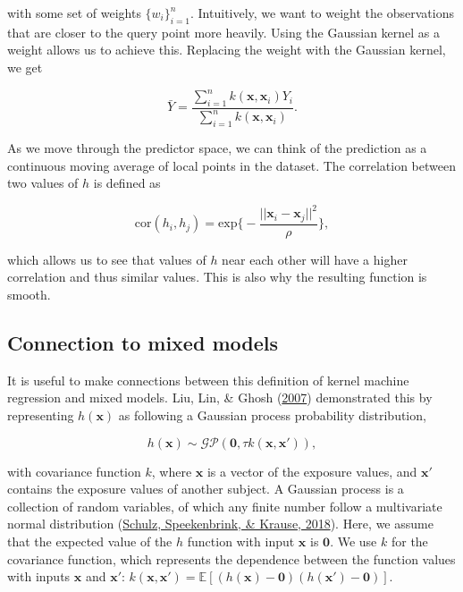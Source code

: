 \documentclass[12pt, twoside]{amherstthesis}
\begin{document}
\noindent with some set of weights \(\{w_i\}_{i=1}^n\). Intuitively, we want to weight the observations that are closer to the query point more heavily. Using the Gaussian kernel as a weight allows us to achieve this. Replacing the weight with the Gaussian kernel, we get

\[
\bar{Y} = \frac{\sum_{i=1}^n k(\textbf{x}, \textbf{x}_i) Y_i}
{\sum_{i=1}^n k(\textbf{x}, \textbf{x}_i)}.
\]

As we move through the predictor space, we can think of the prediction as a continuous moving average of local points in the dataset. The correlation between two values of \(h\) is defined as

\[
\textrm{cor}(h_i, h_j) = \textrm{exp} \bigg\{-\frac{||
\textbf{x}_{i}-\textbf{x}_{j}||^2}{\rho} \bigg\},
\]

\noindent which allows us to see that values of \(h\) near each other will have a higher correlation and thus similar values. This is also why the resulting function is smooth.

\hypertarget{connection-to-mixed-models}{%
\subsection{Connection to mixed models}\label{connection-to-mixed-models}}

It is useful to make connections between this definition of kernel machine regression and mixed models. Liu, Lin, \& Ghosh (\protect\hyperlink{ref-liu_semiparametric_2007}{2007}) demonstrated this by representing \(h(\textbf{x})\) as following a Gaussian process probability distribution,

\[
h(\textbf{x}) \sim \mathcal{GP}(\textbf{0}, \tau k(\textbf{x}, \textbf{x}')),
\]

\noindent with covariance function \(k\), where \(\textbf{x}\) is a vector of the exposure values, and \(\textbf{x}'\) contains the exposure values of another subject. A Gaussian process is a collection of random variables, of which any finite number follow a multivariate normal distribution (\protect\hyperlink{ref-schulz_tutorial_2018}{Schulz, Speekenbrink, \& Krause, 2018}). Here, we assume that the expected value of the \(h\) function with input \(\textbf{x}\) is \(\textbf{0}\). We use \(k\) for the covariance function, which represents the dependence between the function values with inputs \(\textbf{x}\) and \(\textbf{x}'\): \(k(\textbf{x}, \textbf{x}') = \mathbb{E}[(h(\textbf{x})- \textbf{0}) (h(\textbf{x}')- \textbf{0})]\).
\end{document}
